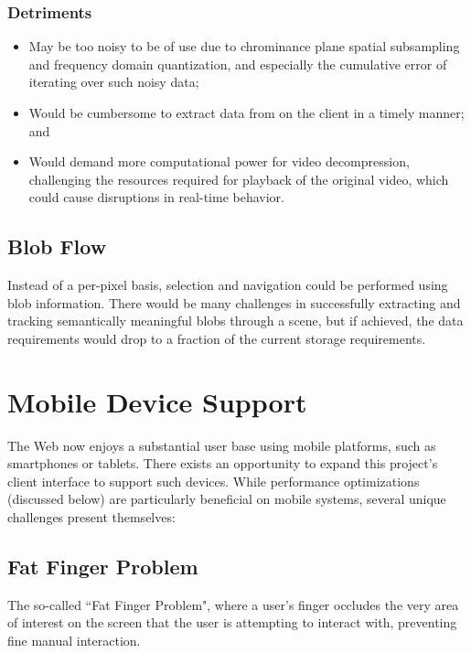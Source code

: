\subsubsection{Detriments}
\begin{itemize}
\item May be too noisy to be of use due to chrominance plane spatial subsampling and frequency domain quantization, and especially the cumulative error of iterating over such noisy data;
\item Would be cumbersome to extract data from on the client in a timely manner; and
\item Would demand more computational power for video decompression, challenging the resources required for playback of the original video, which could cause disruptions in real-time behavior.
\end{itemize}

\subsection{Blob Flow}
Instead of a per-pixel basis, selection and navigation could be performed using blob information. There would be many challenges in successfully extracting and tracking semantically meaningful blobs through a scene, but if achieved, the data requirements would drop to a fraction of the current storage requirements.


\section{Mobile Device Support}
The Web now enjoys a substantial user base using mobile platforms, such as smartphones or tablets. There exists an opportunity to expand this project's client interface to support such devices. While performance optimizations (discussed below) are particularly beneficial on mobile systems, several unique challenges present themselves:


\subsection{Fat Finger Problem}
    The so-called ``Fat Finger Problem", where a user's finger occludes the very area of interest on the screen that the user is attempting to interact with, preventing fine manual interaction.\cite{fatfinger}


